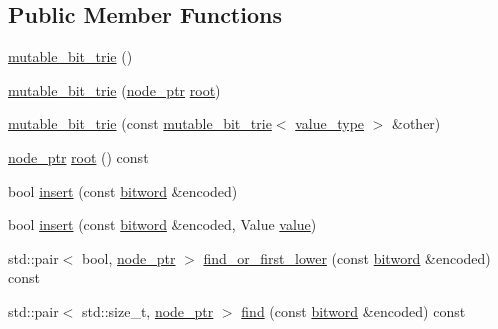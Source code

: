 \subsection*{Public Member Functions}
\begin{DoxyCompactItemize}
\item 
\mbox{\hyperlink{classirk_1_1mutable__bit__trie_a6927e834f866c053925d9ddf902774c1}{mutable\+\_\+bit\+\_\+trie}} ()
\item 
\mbox{\hyperlink{classirk_1_1mutable__bit__trie_a25fac71898d72afb04fc581ee5a913e7}{mutable\+\_\+bit\+\_\+trie}} (\mbox{\hyperlink{classirk_1_1mutable__bit__trie_abd23179ac4f02a981d4f47b4c0652287}{node\+\_\+ptr}} \mbox{\hyperlink{classirk_1_1mutable__bit__trie_a82b109eb8816a4ff9093ca5649d13db9}{root}})
\item 
\mbox{\hyperlink{classirk_1_1mutable__bit__trie_a64b9dd3b47cc74e653843cdf0f87db3b}{mutable\+\_\+bit\+\_\+trie}} (const \mbox{\hyperlink{classirk_1_1mutable__bit__trie}{mutable\+\_\+bit\+\_\+trie}}$<$ \mbox{\hyperlink{classirk_1_1mutable__bit__trie_a398f85c4065b746e6ab10842981a9bf4}{value\+\_\+type}} $>$ \&other)
\item 
\mbox{\hyperlink{classirk_1_1mutable__bit__trie_abd23179ac4f02a981d4f47b4c0652287}{node\+\_\+ptr}} \mbox{\hyperlink{classirk_1_1mutable__bit__trie_a82b109eb8816a4ff9093ca5649d13db9}{root}} () const
\item 
bool \mbox{\hyperlink{classirk_1_1mutable__bit__trie_adc61a687ca59be58a5538e4e9f5df0cc}{insert}} (const \mbox{\hyperlink{namespaceirk_a5d1a67079cf6423ecaededebe848f083}{bitword}} \&encoded)
\item 
bool \mbox{\hyperlink{classirk_1_1mutable__bit__trie_a694f1825422ce94a786bc922baef651d}{insert}} (const \mbox{\hyperlink{namespaceirk_a5d1a67079cf6423ecaededebe848f083}{bitword}} \&encoded, Value \mbox{\hyperlink{classirk_1_1mutable__bit__trie_ad0bb2e18842b722d7deb1a5d4b72b890}{value}})
\item 
std\+::pair$<$ bool, \mbox{\hyperlink{classirk_1_1mutable__bit__trie_abd23179ac4f02a981d4f47b4c0652287}{node\+\_\+ptr}} $>$ \mbox{\hyperlink{classirk_1_1mutable__bit__trie_a30d25f61a4f6e7cb8d9ac6f0ff205f97}{find\+\_\+or\+\_\+first\+\_\+lower}} (const \mbox{\hyperlink{namespaceirk_a5d1a67079cf6423ecaededebe848f083}{bitword}} \&encoded) const
\item 
std\+::pair$<$ std\+::size\+\_\+t, \mbox{\hyperlink{classirk_1_1mutable__bit__trie_abd23179ac4f02a981d4f47b4c0652287}{node\+\_\+ptr}} $>$ \mbox{\hyperlink{classirk_1_1mutable__bit__trie_af0bd766c6c437fcdcb9612ba9de84510}{find}} (const \mbox{\hyperlink{namespaceirk_a5d1a67079cf6423ecaededebe848f083}{bitword}} \&encoded) const

\end{DoxyCompactItemize}
